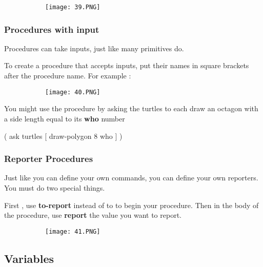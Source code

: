 \documentclass{article}
\begin{document}
\begin{figure}[ht!]
  \centering
  \begin{subfigure}[b]{0.4\linewidth}
    \texttt{[image: 39.PNG]}
  \end{subfigure}
  \end{figure}

\subsubsection{Procedures with input}

Procedures can take inputs, just like many primitives do.

To create a procedure that accepts inputs, put their names in square brackets after the procedure name. For example :


\begin{figure}[ht!]
  \centering
  \begin{subfigure}[b]{0.5\linewidth}
    \texttt{[image: 40.PNG]}
  \end{subfigure}
  \end{figure}

You might use the procedure by asking the turtles to each draw an octagon with a side length equal to its \textbf{who} number

( ask turtles [ draw-polygon 8 who ] )

\subsubsection{Reporter Procedures}

Just like you can define your own commands, you can define your own reporters. You must do two special things.

First , use \textbf{to-report} instead of to to begin your procedure. Then in the body of the procedure, use \textbf{report} the value you want to report.

\begin{figure}[ht!]
  \centering
  \begin{subfigure}[b]{0.4\linewidth}
    \texttt{[image: 41.PNG]}
  \end{subfigure}
  \end{figure}

\subsection{Variables}
\end{document}
